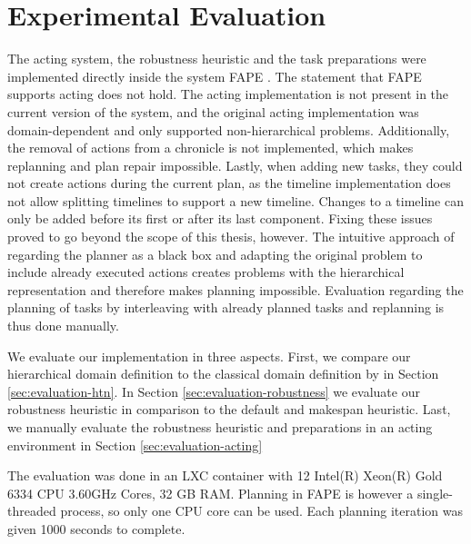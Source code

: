 \section{Experimental Evaluation}\label{sec:evaluation}

The acting system, the robustness heuristic and the task preparations were implemented directly inside the system \ac{FAPE} \citep{bit-monnotTemporalHierarchicalModels2016a}.
The statement that \ac{FAPE} supports acting \citep{dvorakPlanningActingTemporal2014,bit-monnotTemporalHierarchicalModels2016a,bit-monnotFAPEConstraintbasedPlanner2020} does not hold.
The acting implementation is not present in the current version of the system, and the original acting implementation was domain-dependent and only supported non-hierarchical problems.
Additionally, the removal of actions from a chronicle is not implemented, which makes replanning and plan repair impossible.
Lastly, when adding new tasks, they could not create actions during the current plan, as the timeline implementation does not allow splitting timelines to support a new timeline.
Changes to a timeline can only be added before its first or after its last component.
Fixing these issues proved to go beyond the scope of this thesis, however.
The intuitive approach of regarding the planner as a black box and adapting the original problem to include already executed actions creates problems with the hierarchical representation and therefore makes planning impossible.
Evaluation regarding the planning of tasks by interleaving with already planned tasks and replanning is thus done manually.


We evaluate our implementation in three aspects.
First, we compare our hierarchical domain definition to the classical domain definition by \cite{yuxinliuPlanningOvercookedGame2020} in Section \ref{sec:evaluation-htn}.
In Section \ref{sec:evaluation-robustness} we evaluate our robustness heuristic in comparison to the default and makespan heuristic.
Last, we manually evaluate the robustness heuristic and preparations in an acting environment in Section \ref{sec:evaluation-acting}

The evaluation was done in an LXC container with 12 Intel(R) Xeon(R) Gold 6334 CPU 3.60GHz Cores, 32 GB RAM.
Planning in \ac{FAPE} is however a single-threaded process, so only one CPU core can be used.
Each planning iteration was given 1000 seconds to complete.

